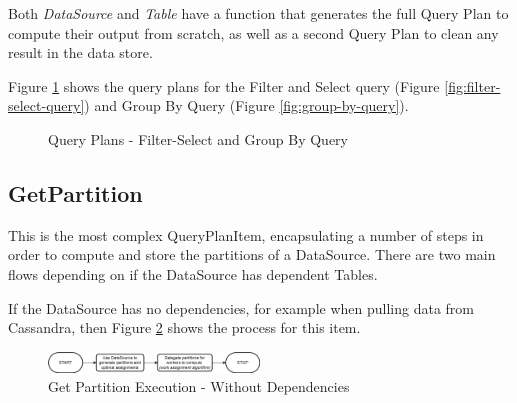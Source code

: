 Both \textit{DataSource} and \textit{Table} have a function that generates the full Query Plan to compute their output from scratch, as well as a second Query Plan to clean any result in the data store. 

Figure \ref{fig:filter-group-by-query-plan} shows the query plans for the Filter and Select query (Figure \ref{fig:filter-select-query}) and Group By Query (Figure \ref{fig:group-by-query}).

\begin{figure}
	\centering
	\qquad
	\caption{Query Plans - Filter-Select and Group By Query}%
	\label{fig:filter-group-by-query-plan}
\end{figure}

\subsection{GetPartition}
This is the most complex QueryPlanItem, encapsulating a number of steps in order to compute and store the partitions of a DataSource. There are two main flows depending on if the DataSource has dependent Tables.

If the DataSource has no dependencies, for example when pulling data from Cassandra, then Figure \ref{fig:get-partition-no-dependencies} shows the process for this item. 

\begin{figure}[h]
	\centering
	\includegraphics[width=0.5\textwidth]{chapters/diagrams/implementation/get-partition-no-dependencies-flow}
	\caption{Get Partition Execution - Without Dependencies}
	\label{fig:get-partition-no-dependencies}
\end{figure}

